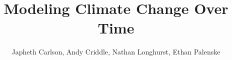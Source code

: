 \documentclass[9pt]{beamer}
\title{\;\;\; Modeling Climate Change Over Time}
\author{\small{Japheth Carlson, Andy Criddle, Nathan Longhurst, Ethan Palenske}}
\institute{\small Brigham Young University}
\begin{document}
\titlepage



        
      
    


\end{document}
